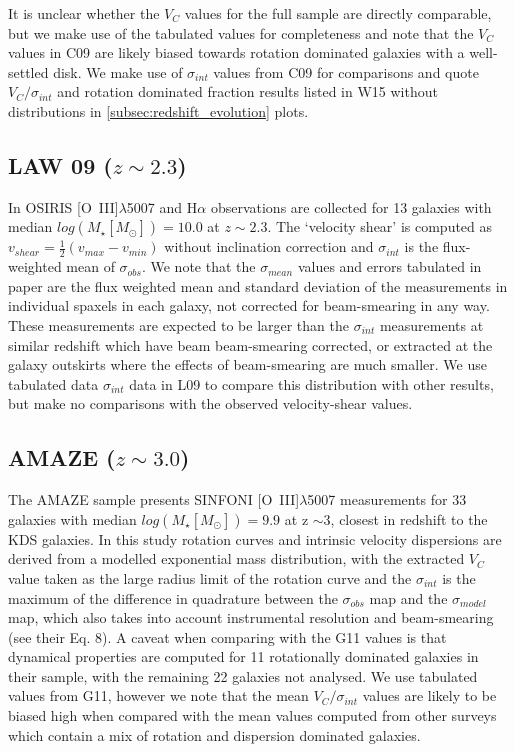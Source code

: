 \documentclass[fleqn,usenatbib]{mn2e}
\begin{document}
It is unclear whether the $V_{C}$ values for the full sample are directly comparable, but we make use of the tabulated values for completeness and note that the $V_{C}$ values in C09 are likely biased towards rotation dominated galaxies with a well-settled disk.
We make use of $\sigma_{int}$ values from C09 for comparisons and quote $V_{C}/\sigma_{int}$ and rotation dominated fraction results listed in W15 without distributions in \cref{subsec:redshift_evolution} plots.

\subsection{LAW 09 ($z\sim2.3$)}\label{subsec:law_09}
In \cite[L09]{Law2009} OSIRIS [O~{\sc III}]$\lambda$5007 and H$\alpha$ observations are collected for 13 galaxies with median $log(M_{\star}[M_{\odot}])=10.0$ at $z\sim2.3$.
The `velocity shear' is computed as $v_{shear} = \frac{1}{2}(v_{max} - v_{min})$ without inclination correction and $\sigma_{int}$ is the flux-weighted mean of $\sigma_{obs}$.
We note that the $\sigma_{mean}$ values and errors tabulated in \cite{Law2009} paper are the flux weighted mean and standard deviation of the measurements in individual spaxels in each galaxy, not corrected for beam-smearing in any way.
These measurements are expected to be larger than the $\sigma_{int}$ measurements at similar redshift which have beam beam-smearing corrected, or extracted at the galaxy outskirts where the effects of beam-smearing are much smaller.
We use tabulated data $\sigma_{int}$ data in L09 to compare this distribution with other results, but make no comparisons with the observed velocity-shear values.

\subsection{AMAZE ($z\sim3.0$)}\label{subsec:AMAZE}
The AMAZE sample \cite[G11]{Gnerucci2011} presents SINFONI [O~{\sc III}]$\lambda$5007 measurements for 33 galaxies with median $log(M_{\star}[M_{\odot}])=9.9$ at z $\sim 3$, closest in redshift to the KDS galaxies.
In this study rotation curves and intrinsic velocity dispersions are derived from a modelled exponential mass distribution, with the extracted $V_{C}$ value taken as the large radius limit of the rotation curve and the $\sigma_{int}$ is the maximum of the difference in quadrature between the $\sigma_{obs}$ map and the $\sigma_{model}$ map, which also takes into account instrumental resolution and beam-smearing (see their Eq. 8).
A caveat when comparing with the G11 values is that dynamical properties are computed for 11 rotationally dominated galaxies in their sample, with the remaining 22 galaxies not analysed.
We use tabulated values from G11, however we note that the mean $V_{C}/\sigma_{int}$ values are likely to be biased high when compared with the mean values computed from other surveys which contain a mix of rotation and dispersion dominated galaxies. \\
\end{document}
